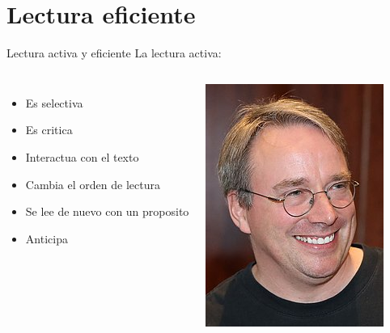 \documentclass[
10pt,
aspectratio=169,
]{beamer}
\begin{document}
\section{Lectura eficiente}
\begin{frame}[c]{Lectura activa y eficiente}
La lectura activa:
\begin{columns}
\begin{itemize}
\item Es selectiva
\item Es critica
\item Interactua con el texto
\item Cambia el orden de lectura
\item Se lee de nuevo con un proposito
\item Anticipa
\end{itemize}
\centering
\includegraphics[width=\textwidth]{linus.jpeg}
\end{columns}
\end{frame}
\end{document}
